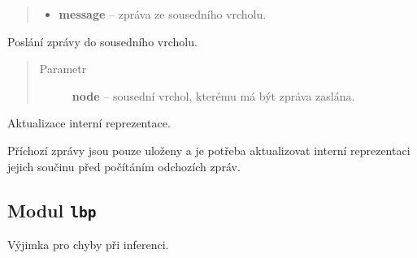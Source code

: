 \begin{fulllineitems}
\begin{fulllineitems}
\begin{quote}
\begin{description}
\begin{itemize}
\item {} 
\textbf{message} -- zpráva ze sousedního vrcholu.

\end{itemize}

\end{description}\end{quote}

\end{fulllineitems}


\begin{fulllineitems}
\label{alex.infer:alex.infer.factor.alex.infer.node.DirichletFactorNode.message_to}
Poslání zprávy do sousedního vrcholu.
\begin{quote}\begin{description}
\item[{Parametr}] \leavevmode
\textbf{node} -- sousední vrchol, kterému má být zpráva zaslána.

\end{description}\end{quote}

\end{fulllineitems}


\begin{fulllineitems}
\label{alex.infer:alex.infer.factor.alex.infer.node.DirichletFactorNode.update}
Aktualizace interní reprezentace.

Příchozí zprávy jsou pouze uloženy a je potřeba aktualizovat interní
reprezentaci jejich součinu před počítáním odchozích zpráv.

\end{fulllineitems}


\end{fulllineitems}



\subsection{Modul \texttt{lbp}}
\label{alex.infer:modul-lbp}

\begin{fulllineitems}
\label{alex.infer:alex.infer.factor.alex.infer.lbp.LBPError}
Výjimka pro chyby při inferenci.

\end{fulllineitems}

